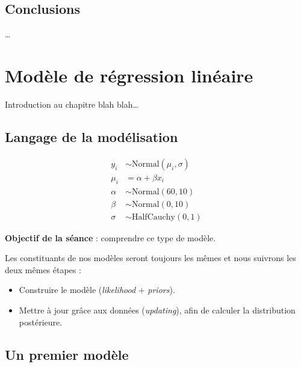 \documentclass[
  a4paper,11pt,twoside,onecolumn,openright,final,oldfontcommands]{memoir}
\providecommand{\tightlist}{%
  \setlength{\itemsep}{0pt}\setlength{\parskip}{0pt}}
\theoremstyle{definition}
\theoremstyle{definition}
\theoremstyle{definition}
\theoremstyle{definition}
\theoremstyle{remark}
\begin{document}
\hypertarget{conclusions}{%
\section{Conclusions}\label{conclusions}}

\ldots{}

\hypertarget{linear-regression1}{%
\chapter{Modèle de régression linéaire}\label{linear-regression1}}


Introduction au chapitre blah blah\ldots{}

\hypertarget{langage-de-la-moduxe9lisation}{%
\section{Langage de la modélisation}\label{langage-de-la-moduxe9lisation}}

\[
\begin{aligned}
y_{i} &\sim \mathrm{Normal}(\mu_{i}, \sigma) \\
\mu_{i}&= \alpha + \beta x_{i} \\
\alpha &\sim \mathrm{Normal}(60, 10) \\
\beta &\sim \mathrm{Normal}(0, 10) \\
\sigma &\sim \mathrm{HalfCauchy}(0, 1)
\end{aligned}
\]

\textbf{Objectif de la séance} : comprendre ce type de modèle.

Les constituants de nos modèles seront toujours les mêmes et nous suivrons les deux mêmes étapes :

\begin{itemize}
\tightlist
\item
  Construire le modèle (\emph{likelihood} + \emph{priors}).
\item
  Mettre à jour grâce aux données (\emph{updating}), afin de calculer la distribution postérieure.
\end{itemize}

\hypertarget{un-premier-moduxe8le}{%
\section{Un premier modèle}\label{un-premier-moduxe8le}}
\end{document}
